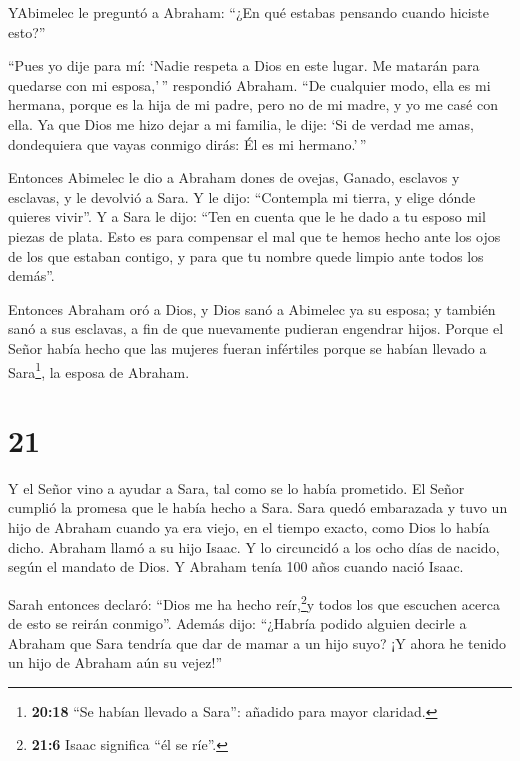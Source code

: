  YAbimelec le preguntó a Abraham: ``¿En qué estabas
pensando cuando hiciste esto?''

 ``Pues yo dije para mí: `Nadie respeta a Dios en este
lugar. Me matarán para quedarse con mi esposa,'\,'' respondió Abraham.
 ``De cualquier modo, ella es mi hermana, porque es la hija
de mi padre, pero no de mi madre, y yo me casé con ella. 
Ya que Dios me hizo dejar a mi familia, le dije: `Si de verdad me amas,
dondequiera que vayas conmigo dirás: Él es mi hermano.'\,''

 Entonces Abimelec le dio a Abraham dones de ovejas,
Ganado, esclavos y esclavas, y le devolvió a Sara.  Y le
dijo: ``Contempla mi tierra, y elige dónde quieres vivir''.
 Y a Sara le dijo: ``Ten en cuenta que le he dado a tu
esposo mil piezas de plata. Esto es para compensar el mal que te hemos
hecho ante los ojos de los que estaban contigo, y para que tu nombre
quede limpio ante todos los demás''.

 Entonces Abraham oró a Dios, y Dios sanó a Abimelec ya su
esposa; y también sanó a sus esclavas, a fin de que nuevamente pudieran
engendrar hijos.  Porque el Señor había hecho que las
mujeres fueran infértiles porque se habían llevado a Sara\footnote{\textbf{20:18}
  ``Se habían llevado a Sara'': añadido para mayor claridad.}, la esposa
de Abraham.

\hypertarget{section-20}{%
\section{21}\label{section-20}}

 Y el Señor vino a ayudar a Sara, tal como se lo había
prometido. El Señor cumplió la promesa que le había hecho a Sara.
 Sara quedó embarazada y tuvo un hijo de Abraham cuando ya
era viejo, en el tiempo exacto, como Dios lo había dicho. 
Abraham llamó a su hijo Isaac.  Y lo circuncidó a los ocho
días de nacido, según el mandato de Dios.  Y Abraham tenía
100 años cuando nació Isaac.

 Sarah entonces declaró: ``Dios me ha hecho
reír,\footnote{\textbf{21:6} Isaac significa ``él se ríe''.}y todos los
que escuchen acerca de esto se reirán conmigo''.  Además
dijo: ``¿Habría podido alguien decirle a Abraham que Sara tendría que
dar de mamar a un hijo suyo? ¡Y ahora he tenido un hijo de Abraham aún
su vejez!''

